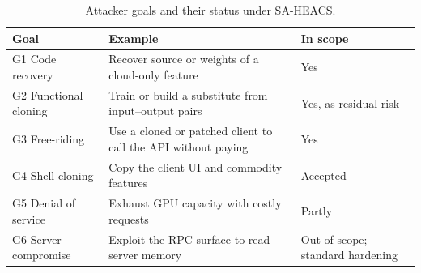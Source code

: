 \begin{table}[htbp]
\centering
\caption{Attacker goals and their status under SA-HEACS.}\label{tab:goals}
\small
\begin{tabularx}{\linewidth}{@{}l Y l@{}}
\toprule
Goal & Example & In scope \\
\midrule
G1 Code recovery      & Recover source or weights of a cloud-only feature & Yes \\
G2 Functional cloning & Train or build a substitute from input--output pairs & Yes, as residual risk \\
G3 Free-riding        & Use a cloned or patched client to call the API without paying & Yes \\
G4 Shell cloning      & Copy the client UI and commodity features & Accepted \\
G5 Denial of service  & Exhaust GPU capacity with costly requests & Partly \\
G6 Server compromise  & Exploit the RPC surface to read server memory & Out of scope; standard hardening \\
\bottomrule
\end{tabularx}
\end{table}
